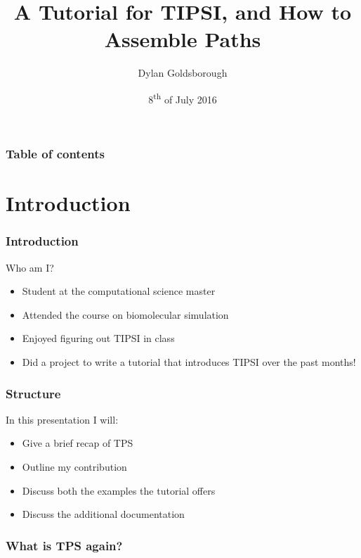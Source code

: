 \documentclass[hyperref={pdfpagelabels=false}]{beamer}
\title{A Tutorial for \textsc{TIPSI}, and How to Assemble Paths}
\author{Dylan Goldsborough}
\date{8\textsuperscript{th} of July 2016}
\begin{document}
\begin{frame}
\titlepage
\end{frame} 

\begin{frame}
\frametitle{Table of contents}
\tableofcontents
\end{frame} 


\section{Introduction} 
\setcounter{subsection}{1}
\begin{frame}
\frametitle{Introduction}
Who am I?
\begin{itemize}
\item Student at the computational science master
\item Attended the course on biomolecular simulation
\item Enjoyed figuring out \textsc{TIPSI} in class
\item Did a project to write a tutorial that introduces \textsc{TIPSI} over the past months!
\end{itemize}
\end{frame}

\begin{frame}
\frametitle{Structure}
In this presentation I will:
\begin{itemize}
\item Give a brief recap of TPS
\item Outline my contribution
\item Discuss both the examples the tutorial offers
\item Discuss the additional documentation
\end{itemize} 
\end{frame}

\begin{frame}
\frametitle{What is TPS again?} 
\end{frame}
\end{document}
